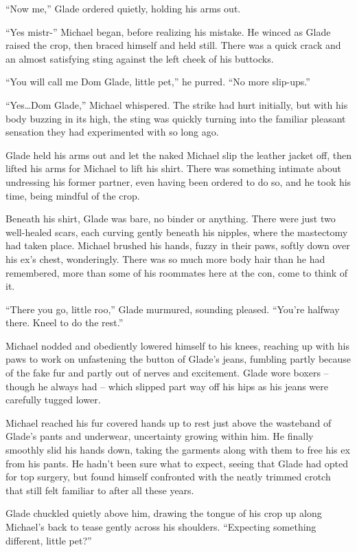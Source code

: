 ``Now me,'' Glade ordered quietly, holding his arms out.

``Yes mistr-'' Michael began, before realizing his mistake.  He winced as Glade raised the crop, then braced himself and held still.  There was a quick crack and an almost satisfying sting against the left cheek of his buttocks.

``You will call me Dom Glade, little pet,'' he purred.  ``No more slip-ups.''

``Yes\ldots{}Dom Glade,'' Michael whispered.  The strike had hurt initially, but with his body buzzing in its high, the sting was quickly turning into the familiar pleasant sensation they had experimented with so long ago.

Glade held his arms out and let the naked Michael slip the leather jacket off, then lifted his arms for Michael to lift his shirt.  There was something intimate about undressing his former partner, even having been ordered to do so, and he took his time, being mindful of the crop.

Beneath his shirt, Glade was bare, no binder or anything.  There were just two well-healed scars, each curving gently beneath his nipples, where the mastectomy had taken place.  Michael brushed his hands, fuzzy in their paws, softly down over his ex's chest, wonderingly.  There was so much more body hair than he had remembered, more than some of his roommates here at the con, come to think of it.

``There you go, little roo,'' Glade murmured, sounding pleased.  ``You're halfway there.  Kneel to do the rest.''

Michael nodded and obediently lowered himself to his knees, reaching up with his paws to work on unfastening the button of Glade's jeans, fumbling partly because of the fake fur and partly out of nerves and excitement.  Glade wore boxers -- though he always had -- which slipped part way off his hips as his jeans were carefully tugged lower.

Michael reached his fur covered hands up to rest just above the wasteband of Glade's pants and underwear, uncertainty growing within him.  He finally smoothly slid his hands down, taking the garments along with them to free his ex from his pants.  He hadn't been sure what to expect, seeing that Glade had opted for top surgery, but found himself confronted with the neatly trimmed crotch that still felt familiar to after all these years.

Glade chuckled quietly above him, drawing the tongue of his crop up along Michael's back to tease gently across his shoulders.  ``Expecting something different, little pet?''

